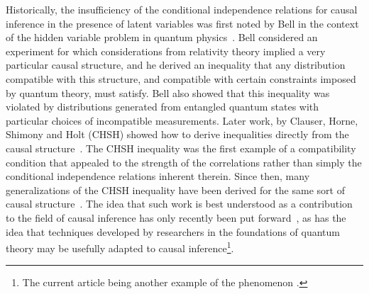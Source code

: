 \documentclass[aps,english,10pt,superscriptaddress,onecolumn,twoside,longbibliography,pra,floatfix,fleqn,nofootinbib]{revtex4-1}
\theoremstyle{definition}
\newcounter{example}[section]
\begin{document}
%

Historically, the insufficiency of the conditional independence relations for causal inference in the presence of latent variables was first
noted by Bell in the context of the hidden variable problem in quantum physics~\cite{bell1964einstein}. Bell considered an experiment for which considerations from relativity theory implied a very particular causal structure, and he derived an inequality
that any distribution compatible with this structure, and compatible with certain constraints imposed by quantum
theory, must satisfy. Bell also showed that this inequality was violated by distributions generated from entangled
quantum states with particular choices of incompatible measurements. Later work, by Clauser, Horne, Shimony and
Holt (CHSH) showed how to derive inequalities directly from the causal structure~\cite{CHSHOriginal}. The CHSH inequality was the
first example of a compatibility condition that appealed to the strength of the correlations rather than simply the
conditional independence relations inherent therein.
Since then, many generalizations of the CHSH inequality have been derived for the same sort of causal structure~\cite{Brunner2013Bell}. The idea that such work is best understood as a contribution to the field of causal inference has only recently been put forward~\cite{WoodSpekkens,fritz2012bell,pusey2014gdag,BeyondBellII}, as has the idea that techniques developed by researchers in the foundations of quantum theory may be usefully adapted to causal inference\footnote{The current article being another example of the phenomenon \cite{BeyondBellII,ChavesNoSignalling,chaves2014informationinference,weilenmann2016entropic,kela2016covariance,ChavesPolynomial,TavakoliStarNetworks,RossetNetworks,TavakoliNoncyclicNetworks}.}.
\end{document}
